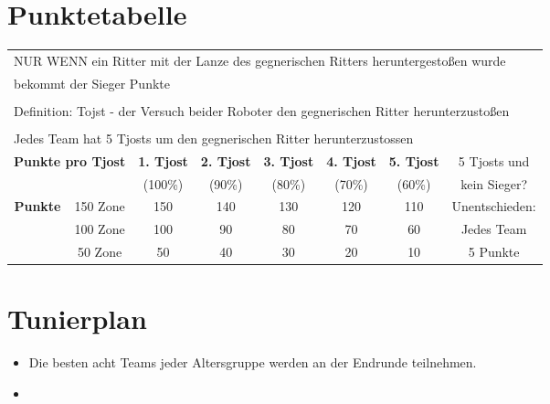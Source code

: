 \documentclass[a4paper,12pt]{article}
\begin{document}
\section{Punktetabelle}
\begin{center}
\begin{tabular}{|c|c|c|c|c|c|c|c|} \hline
	\multicolumn{8}{|l|}{NUR WENN ein Ritter mit der Lanze des gegnerischen Ritters heruntergestoßen wurde}\\
	\multicolumn{8}{|l|}{bekommt der Sieger Punkte}\\
	\multicolumn{8}{|l|}{}\\
	\multicolumn{8}{|l|}{Definition: Tojst - der Versuch beider Roboter den gegnerischen Ritter herunterzustoßen}\\
	\multicolumn{8}{|l|}{}\\
	\multicolumn{8}{|l|}{Jedes Team hat 5 Tjosts um den gegnerischen Ritter herunterzustossen} \\ \hline
	\multicolumn{2}{|c|}{\multirow{2}{*}{\textbf{Punkte pro Tjost}}} & \textbf{1. Tjost} & \textbf{2. Tjost} & \textbf{3. Tjost} & \textbf{4. Tjost} & \textbf{5. Tjost} & 5 Tjosts und \\
	\multicolumn{2}{|c|}{}  & (100\%) & (90\%) & (80\%) & (70\%) & (60\%) & kein Sieger? \\
	\cline{1-7}
	\multirow{3}{*}{\textbf{Punkte}} & 150 Zone & 150 & 140 & 130 & 120 & 110 & Unentschieden: \\
	\cline{2-7}
	& 100 Zone & 100 & 90 & 80 & 70 & 60 & Jedes Team \\
	\cline{2-7}
	& 50  Zone& 50 & 40 & 30 & 20 & 10 & 5 Punkte \\
	\hline
\end{tabular}
\end{center}

\pagebreak
\section{Tunierplan}
\begin{itemize}
	\item Die besten acht Teams jeder Altersgruppe werden an der Endrunde
		teilnehmen.
        \item \tournamentQualification
\end{itemize}
\tournamentScoring
\combinedTournament
\end{document}
